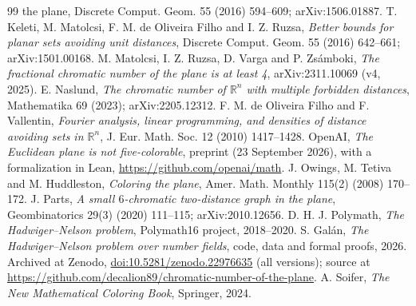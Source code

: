\documentclass[11pt,a4paper]{amsart}
\theoremstyle{definition}
\theoremstyle{remark}
\newcommand{\R}{\mathbb{R}}
\begin{document}
\begin{thebibliography}{99}
{the plane}, Discrete Comput. Geom. 55 (2016) 594--609; arXiv:1506.01887.
 T. Keleti, M. Matolcsi, F. M. de Oliveira Filho and I. Z. Ruzsa, \emph{Better bounds for planar sets
avoiding unit distances}, Discrete Comput. Geom. 55 (2016) 642--661; arXiv:1501.00168.
 M. Matolcsi, I. Z. Ruzsa, D. Varga and P. Zsámboki, \emph{The fractional chromatic number of the
plane is at least 4}, arXiv:2311.10069 (v4, 2025).
 E. Naslund, \emph{The chromatic number of $\R^n$ with multiple forbidden distances}, Mathematika 69
(2023); arXiv:2205.12312.
 F. M. de Oliveira Filho and F. Vallentin, \emph{Fourier analysis, linear programming, and densities of
distance avoiding sets in $\R^n$}, J. Eur. Math. Soc. 12 (2010) 1417--1428.
 OpenAI, \emph{The Euclidean plane is not five-colorable}, preprint (23 September 2026), with a
formalization in Lean, \url{https://github.com/openai/math}.
 J. Owings, M. Tetiva and M. Huddleston, \emph{Coloring the plane}, Amer. Math. Monthly 115(2) (2008)
170--172.
 J. Parts, \emph{A small $6$-chromatic two-distance graph in the plane}, Geombinatorics 29(3) (2020)
111--115; arXiv:2010.12656.
 D. H. J. Polymath, \emph{The Hadwiger--Nelson problem}, Polymath16 project, 2018--2020.
 S. Gal\'an, \emph{The Hadwiger--Nelson problem over number fields}, code, data and formal proofs,
2026. Archived at Zenodo, \href{https://doi.org/10.5281/zenodo.22976635}{doi:10.5281/zenodo.22976635} (all
versions); source at \url{https://github.com/decalion89/chromatic-number-of-the-plane}.
 A. Soifer, \emph{The New Mathematical Coloring Book}, Springer, 2024.
\end{thebibliography}
\end{document}
